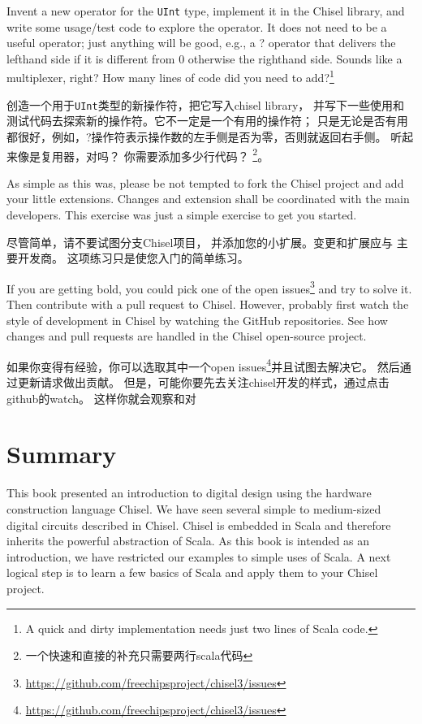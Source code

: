 \documentclass[%
    10pt,
    headinclude, footexclude,
    openright, %
    notitlepage,
    cleardoubleempty,
    headsepline,
    pointlessnumbers,
    bibtotoc, idxtotoc,
    ]{scrbook}
\newcommand{\code}[1]{{\small{\texttt{#1}}}}
\newcommand{\myref}[2]{\href{#1}{#2}}
\renewcommand{\myref}[2]{{#2}{\footnote{\url{#1}}}}
\begin{document}
{Invent a new operator for the \code{UInt} type, implement it in the Chisel library,
and write some usage/test code to explore the operator. It does not need to be
a useful operator; just anything will be good, e.g., a ? operator that delivers the lefthand side
if it is different from 0 otherwise the righthand side. Sounds like a multiplexer, right?
How many lines of code did you need to add?\footnote{A quick and dirty implementation
needs just two lines of Scala code.}

创造一个用于\code{UInt}类型的新操作符，把它写入chisel library，
并写下一些使用和测试代码去探索新的操作符。它不一定是一个有用的操作符；
只是无论是否有用都很好，例如，?操作符表示操作数的左手侧是否为零，否则就返回右手侧。
听起来像是复用器，对吗？
你需要添加多少行代码？
\footnote{一个快速和直接的补充只需要两行scala代码}。


As simple as this was, please be not tempted to fork the Chisel project and
add your little extensions. Changes and extension shall be coordinated with the
main developers.
This exercise was just a simple exercise to get you started.


尽管简单，请不要试图分支Chisel项目，
并添加您的小扩展。变更和扩展应与
主要开发商。
这项练习只是使您入门的简单练习。

If you are getting bold, you could pick one of the
\myref{https://github.com/freechipsproject/chisel3/issues}{open issues} and try to solve it.
Then contribute with a pull request to Chisel.
However, probably first watch the style of development in Chisel by watching the GitHub
repositories.
See how changes and pull requests are handled in the Chisel open-source project.

如果你变得有经验，你可以选取其中一个\myref{https://github.com/freechipsproject/chisel3/issues}{open issues}并且试图去解决它。
然后通过更新请求做出贡献。
但是，可能你要先去关注chisel开发的样式，通过点击github的watch。
这样你就会观察和对


\chapter{Summary}
\label{sec:conclusion}

This book presented an introduction to digital design using the
hardware construction language Chisel.
We have seen several simple to medium-sized digital circuits
described in Chisel.
Chisel is embedded in Scala and therefore inherits the powerful
abstraction of Scala.
As this book is intended as an introduction, we have restricted
our examples to simple uses of Scala.
A next logical step is to learn a few basics of Scala and apply them
to your Chisel project.

}
\end{document}
